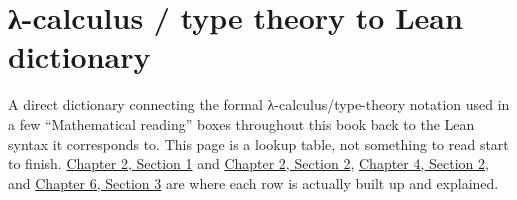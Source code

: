 \chapter*{λ-calculus / type theory to Lean dictionary}
\setcounter{section}{0}\label{sec:root:lambda-calculus-dictionary:1}

A direct dictionary connecting the formal λ-calculus/type-theory notation used in a few ``Mathematical reading'' boxes throughout this book back to the Lean syntax it corresponds to. This page is a lookup table, not something to read start to finish. \hyperref[sec:02-terminology-and-coc:01-terminology:1]{Chapter 2, Section 1} and \hyperref[sec:02-terminology-and-coc:02-pi-sigma-and-coc:1]{Chapter 2, Section 2}, \hyperref[sec:04-propositions-and-proofs:02-logic-recap:1]{Chapter 4, Section 2}, and \hyperref[sec:06-rigor-check:03-typing-rules-and-safety:1]{Chapter 6, Section 3} are where each row is actually built up and explained.

